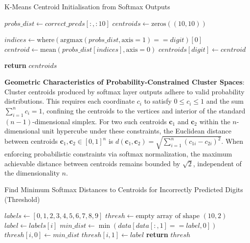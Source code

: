 \begin{algorithm}
\caption{K-Means Centroid Initialisation from Softmax Outputs}
\label{alg:k-means-centroid-init} 
\begin{algorithmic}[1]

\State $probs\_dist \gets correct\_preds[:, :10]$ 
\State $centroids \gets \text{zeros}((10, 10))$ 

\State $indices \gets \text{where}(\text{argmax}(probs\_dist, \text{axis}=1) == digit)[0]$ 
\State $centroid \gets \text{mean}(probs\_dist[indices], \text{axis}=0)$ 
\State $centroids[digit] \gets centroid$ 
\EndFor

\State \textbf{return} $centroids$
\end{algorithmic}
\end{algorithm}


\textbf{Geometric Characteristics of Probability-Constrained Cluster Spaces}: Cluster centroids produced by  softmax layer outputs adhere to valid probability distributions. This requires each coordinate \( c_i \) to satisfy \( 0 \leq c_i \leq 1 \) and the sum \( \sum_{i=1}^n c_i = 1 \), confining the centroids to the vertices and interior of the standard \((n-1)\)-dimensional simplex. For two such centroids \( \mathbf{c}_1 \) and \( \mathbf{c}_2 \) within the \( n \)-dimensional unit hypercube under these constraints, the Euclidean distance between centroids \( \mathbf{c}_1, \mathbf{c}_2 \in [0,1]^n \) is \( d(\mathbf{c}_1, \mathbf{c}_2) = \sqrt{\sum_{i=1}^{n}\left(c_{1i} - c_{2i}\right)^2} \). When enforcing probabilistic constraints via softmax normalization, the maximum achievable distance between centroids remains bounded by \(\sqrt{2}\), independent of the dimensionality \( n \).

\begin{algorithm}
\caption{Find Minimum Softmax Distances to Centroids for Incorrectly Predicted Digits (Threshold)}
\label{alg:min_distance} 
\begin{algorithmic}[1]
    \State $labels \gets [0, 1, 2, 3, 4, 5, 6, 7, 8, 9]$
    \State $thresh \gets \text{empty array of shape } (10, 2)$
        \State $label \gets labels[i]$
        \State $min\_dist \gets \min(data[data[:, 1] == label, 0])$
        \State $thresh[i, 0] \gets min\_dist$
        \State $thresh[i, 1] \gets label$
    \EndFor
    \State \textbf{return} $thresh$
\EndProcedure
\end{algorithmic}
\end{algorithm}

